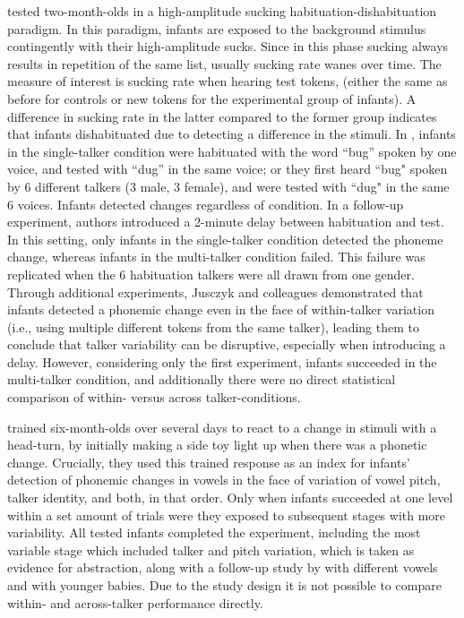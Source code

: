 \documentclass[10pt,letterpaper]{article}
\begin{document}
 tested two-month-olds in a high-amplitude sucking habituation-dishabituation paradigm. In this paradigm, infants are exposed to the background stimulus contingently with their high-amplitude sucks. Since in this phase sucking always results in repetition of the same list, usually sucking rate wanes over time. The measure of interest is sucking rate when hearing test tokens, (either the same as before for controls or new tokens for the experimental group of infants). A difference in sucking rate in the latter compared to the former group indicates that infants dishabituated due to detecting a difference in the stimuli. In , infants in the single-talker condition were habituated with the word ``bug'' spoken by one voice, and  tested with ``dug'' in the same voice; or they first heard ``bug" spoken by 6 different talkers (3 male, 3 female), and were tested with ``dug" in the same 6 voices. Infants detected changes regardless of condition. In a follow-up experiment, authors introduced a 2-minute delay between habituation and test. In this setting, only infants in the single-talker condition detected the phoneme change, whereas infants in the multi-talker condition failed. This failure was replicated when the 6 habituation talkers were all drawn from one gender. Through additional experiments, Jusczyk and colleagues demonstrated that infants detected a phonemic change even in the face of within-talker variation (i.e., using multiple different tokens from the same talker), leading them to conclude that talker variability can be disruptive, especially when introducing a delay. However, considering only the first experiment, infants succeeded in the multi-talker condition, and additionally there were no direct statistical comparison of within- versus across talker-conditions.



 trained six-month-olds over several days to react to a change in stimuli with a head-turn, by initially making a side toy light up when there was a phonetic change. Crucially, they used this trained response as an index for infants' detection of phonemic changes in vowels in the face of variation of vowel pitch, talker identity, and both, in that order. Only when infants succeeded at one level within a set amount of trials were they exposed to subsequent stages with more variability. All tested infants completed the experiment, including the most variable stage which included talker and pitch variation, which is taken as evidence for abstraction, along with a follow-up study by  with different vowels and  with younger babies. Due to the study design it is not possible to compare within- and across-talker performance directly. 
\end{document}
